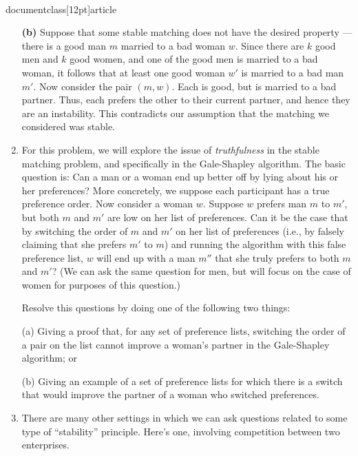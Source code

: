 \\documentclass[12pt]{article}
\begin{document}
\begin{enumerate}
{{\bf (b)}
Suppose that some stable matching does not have
the desired property --- there is a good man $m$
married to a bad woman $w$.
Since there are $k$ good men and $k$ good women,
and one of the good men is married to a bad woman,
it follows that at least one good woman $w'$ is
married to a bad man $m'$.
Now consider the pair $(m,w)$.
Each is good, but is married to a bad partner.
Thus, each prefers the other to their current partner,
and hence they are an instability.
This contradicts our assumption that the
matching we considered was stable.

}



\item\Star
For this problem, we will explore the issue of {\em truthfulness} in the
stable matching problem, and specifically in the Gale-Shapley algorithm.
The basic question is: Can a man or a woman end up better off by lying about
his or her preferences?
More concretely, we suppose each participant has a true preference order.
Now consider a woman $w$. Suppose $w$ prefers man $m$ to
$m'$, but both $m$ and $m'$ are low on her list of preferences. Can it be
the case that by switching the order of $m$ and $m'$ on her list of
preferences (i.e., by falsely claiming that she prefers $m'$ to $m$) and
running the algorithm with this false preference list, $w$ will end up with
a man $m''$ that she truly prefers to both $m$ and $m'$? 
(We can ask the same question for men, but will focus on the
case of women for purposes of this question.)

Resolve this questions by doing one of the following two things:

(a) Giving a proof that, for any set of preference lists, switching the order
of a pair on the list cannot improve a woman's partner in the
Gale-Shapley algorithm; or 

(b) Giving an example of a set of preference lists for which there
is a switch that would improve the partner of a woman who
switched preferences.


\item 

There are many other settings
in which we can
ask questions related to some type of ``stability'' principle.
Here's one, involving competition between two enterprises.


\end{enumerate}
\end{document}
